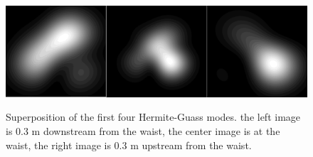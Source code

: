 \begin{figure}
\includegraphics[width=6.00in]
{hermite-gauss/hermite-gauss.png}\\
\caption[Superposition of the first four Hermite-Guass modes]{Superposition of the first four Hermite-Guass modes. the left image is 0.3 m downstream from the waist, the center image is at the waist, the right image is 0.3 m upstream from the waist.}
\label{hermite-gauss}
\end{figure} 

